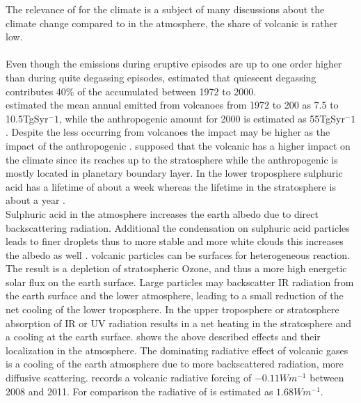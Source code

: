 \documentclass  [
  paper    = a4,
  BCOR     = 10mm,
  twoside,
  fontsize = 12pt,
  fleqn,
  toc      = bibnumbered,
  toc      = listofnumbered,
  numbers  = noendperiod,
  headings = normal,
  listof   = leveldown,
  version  = 3.03
]                                       {scrreprt}
\begin{document}
The relevance of   for the climate is a subject of many discussions about the climate change compared to  in the atmosphere, the share of volcanic   is rather low.\\
\\
Even though the  emissions during eruptive episodes are up to one order higher than during quite degassing episodes, \cite{halmer2002annual} estimated that quiescent degassing contributes 40\% of the accumulated  between 1972 to 2000.\\
\cite{halmer2002annual} estimated the mean annual   emitted from volcanoes from 1972 to 200 as 7.5 to 10.5TgSyr$^-1$, while the anthropogenic   amount for 2000 is estimated as 55TgSyr$^-1$ \citep{IPCC}. Despite the less   occurring from volcanoes the impact may be higher as the impact of the anthropogenic . \cite{graf1997volcanic} supposed that the volcanic   has a higher impact on the climate since its reaches up to the stratosphere while the anthropogenic   is mostly located in planetary boundary layer. In the lower troposphere sulphuric acid has a lifetime of about a week whereas the lifetime in the stratosphere is about a year \citep{IPCC}.\\
Sulphuric acid in the atmosphere increases the earth albedo due to direct backscattering radiation. Additional the condensation on sulphuric acid particles leads to finer droplets thus to more stable and more white clouds this increases the albedo as well \citep{twomey1974pollution}.
volcanic particles can be surfaces for heterogeneous reaction. The result is a depletion of stratospheric Ozone, and thus a more high energetic solar flux on the earth surface.
Large particles may backscatter IR radiation from the earth surface and the lower atmosphere, leading to a small reduction of the net cooling of the lower troposphere.
In the upper troposphere or stratosphere absorption of IR or UV radiation results in a net heating in the stratosphere and a cooling at the earth surface.
 shows the above described effects and their localization in the atmosphere.
The dominating radiative effect of volcanic gases is a cooling of the earth atmosphere due to  more backscattered radiation, more diffusive scattering\citep{robock2000volcanic}.
\cite{IPCC} records a volcanic radiative forcing of $-0.11Wm^{-1}$ between 2008 and 2011. For comparison the radiative of   is estimated as  $1.68Wm^{-1}$.
\end{document}
